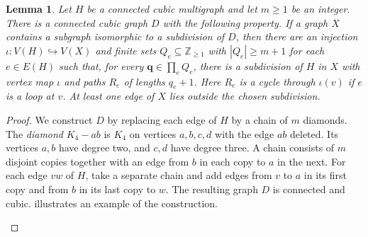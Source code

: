 \documentclass[10pt,a4paper]{article}
\theoremstyle{plain}
\newtheorem{lemma}[theorem]{Lemma}
\theoremstyle{definition}
\newcommand{\Z}{\mathbb{Z}}
\begin{document}
\begin{lemma}\label{lem:independent-path-lengths}
 Let $H$ be a connected cubic multigraph and let $m\geq1$ be an integer.
 There is a connected cubic graph $D$ with the following property.
 If a graph $X$ contains a subgraph isomorphic to a subdivision of $D$,
 then there are an injection $\iota:V(H)\hookrightarrow V(X)$ and finite
 sets $Q_e\subseteq\Z_{\geq1}$ with $|Q_e|\geq m+1$ for each $e\in E(H)$
 such that, for every $\mathbf q\in\prod_eQ_e$, there is a subdivision
 of $H$ in $X$ with vertex map $\iota$ and paths $R_e$ of lengths $q_e+1$.
 Here $R_e$ is a cycle through $\iota(v)$ if $e$ is a loop at $v$.
 At least one edge of $X$ lies outside the chosen subdivision.
\end{lemma}
\begin{proof}
We construct $D$ by replacing each edge of $H$ by a chain of $m$ diamonds.
The \emph{diamond} $K_4-ab$ is $K_4$ on vertices $a,b,c,d$ with the
edge $ab$ deleted. Its vertices $a,b$ have degree two, and $c,d$ have
degree three. A chain consists of $m$ disjoint copies together with
an edge from $b$ in each copy to $a$ in the next.
For each edge $vw$ of $H$, take a separate chain and add edges from
$v$ to $a$ in its first copy and from $b$ in its last copy to $w$.
The resulting graph $D$ is connected and cubic.
 illustrates an example of the construction.
\begin{figure}[tb]
\centering
{}
\end{figure}
\end{proof}
\end{document}
